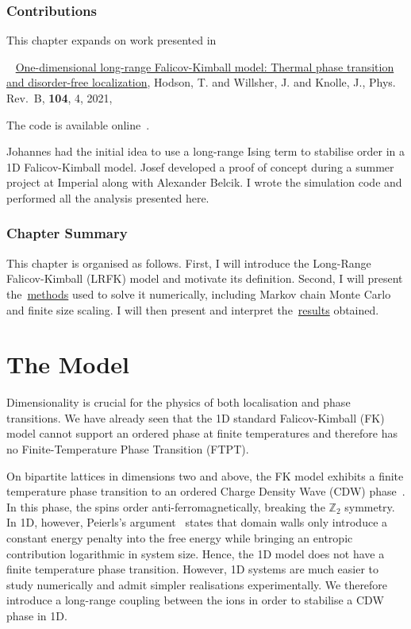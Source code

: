 \hypertarget{lrfk-contributions}{%
\subsubsection{Contributions}\label{lrfk-contributions}}

This chapter expands on work presented in

~\autocite{hodsonOnedimensionalLongrangeFalikovKimball2021} \href{https://link.aps.org/doi/10.1103/PhysRevB.104.045116}{One-dimensional long-range Falicov-Kimball model: Thermal phase transition and disorder-free localization}, Hodson, T. and Willsher, J. and Knolle, J., Phys. Rev.~B, \textbf{104}, 4, 2021,

The code is available online~\autocite{hodsonMCMCFKModel2021}.

Johannes had the initial idea to use a long-range Ising term to stabilise order in a 1D Falicov-Kimball model. Josef developed a proof of concept during a summer project at Imperial along with Alexander Belcik. I wrote the simulation code and performed all the analysis presented here.

\hypertarget{lrfk-chapter-summary}{%
\subsubsection{Chapter Summary}\label{lrfk-chapter-summary}}

This chapter is organised as follows. First, I will introduce the Long-Range Falicov-Kimball (LRFK) model and motivate its definition. Second, I will present the~\protect\hyperlink{sec:lrfk-methods}{methods} used to solve it numerically, including Markov chain Monte Carlo and finite size scaling. I will then present and interpret the~\protect\hyperlink{sec:lrfk-results}{results} obtained.

\hypertarget{sec:lrfk-model}{%
\section{The Model}\label{sec:lrfk-model}}

Dimensionality is crucial for the physics of both localisation and phase transitions. We have already seen that the 1D standard Falicov-Kimball (FK) model cannot support an ordered phase at finite temperatures and therefore has no Finite-Temperature Phase Transition (FTPT).

On bipartite lattices in dimensions two and above, the FK model exhibits a finite temperature phase transition to an ordered Charge Density Wave (CDW) phase~\autocite{maskaThermodynamicsTwodimensionalFalicovKimball2006}. In this phase, the spins order anti-ferromagnetically, breaking the \(\mathbb{Z}_2\) symmetry. In 1D, however, Peierls's argument~\autocite{peierlsIsingModelFerromagnetism1936,kennedyItinerantElectronModel1986} states that domain walls only introduce a constant energy penalty into the free energy while bringing an entropic contribution logarithmic in system size. Hence, the 1D model does not have a finite temperature phase transition. However, 1D systems are much easier to study numerically and admit simpler realisations experimentally. We therefore introduce a long-range coupling between the ions in order to stabilise a CDW phase in 1D.

